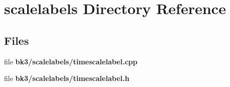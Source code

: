 \section{scalelabels Directory Reference}
\label{dir_4cf95b0d70d345f7bbf9fb50b0b80769}
\subsection*{Files}
\begin{DoxyCompactItemize}
\item 
file {\bf bk3/scalelabels/timescalelabel.\+cpp}
\item 
file {\bf bk3/scalelabels/timescalelabel.\+h}
\end{DoxyCompactItemize}
